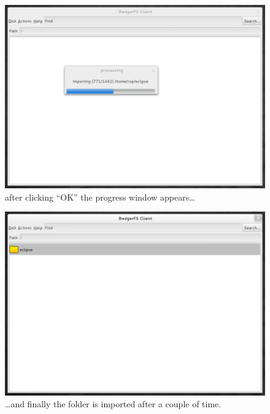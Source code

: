 \begin{figure}[h!]
\centering
\includegraphics[width=1\textwidth]{figures/05_quickstart.png}
\caption{after clicking ``OK'' the progress window appears\ldots}
\label{fig:05_quickstart}
\end{figure}

\begin{figure}[h!]
\centering
\includegraphics[width=1\textwidth]{figures/06_quickstart.png}
\caption{\ldots and finally the folder is imported after a couple of time.}
\label{fig:06_quickstart}
\end{figure}